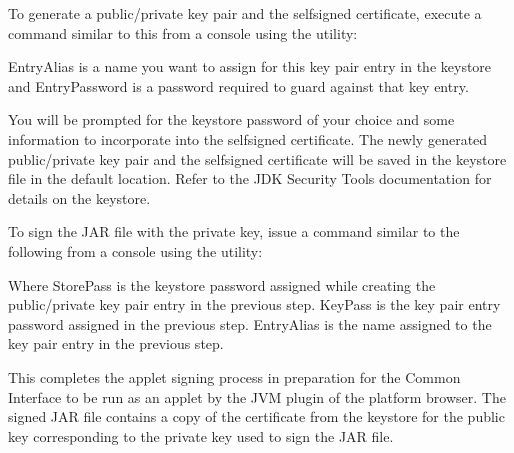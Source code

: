 \documentclass[letterpaper,12pt,english,openany,oneside]{sphinxmanual}
\begin{document}
To generate a public/private key pair and the self\sphinxhyphen{}signed certificate, execute a command similar to this from a console using the  utility:

\begin{sphinxVerbatim}[commandchars=\\\{\}]
     
\end{sphinxVerbatim}

EntryAlias is a name you want to assign for this key pair entry in the keystore and EntryPassword is a password required to guard against that key entry.

You will be prompted for the keystore password of your choice and some information to incorporate into the self\sphinxhyphen{}signed certificate. The newly generated public/private key pair and the self\sphinxhyphen{}signed certificate will be saved in the keystore file in the default location. Refer to the JDK Security Tools documentation for details on the keystore.

To sign the JAR file with the private key, issue a command similar to the following from a console using the  utility:

\begin{sphinxVerbatim}[commandchars=\\\{\}]
     

\end{sphinxVerbatim}

Where StorePass is the keystore password assigned while creating the public/private key pair entry in the previous step. KeyPass is the key pair entry password assigned in the previous step. EntryAlias is the name assigned to the key pair entry in the previous step.

This completes the applet signing process in preparation for the Common Interface to be run as an applet by the JVM plug\sphinxhyphen{}in of the platform browser. The signed JAR file contains a copy of the certificate from the keystore for the public key corresponding to the private key used to sign the JAR file.
\end{document}
